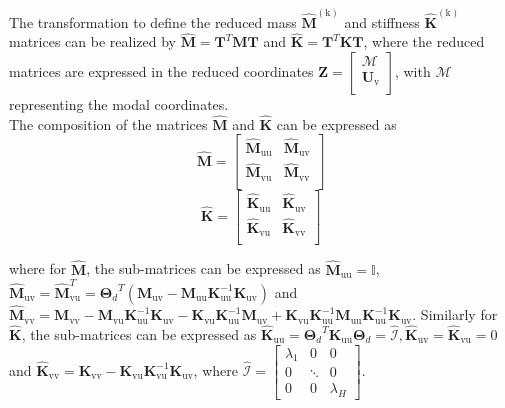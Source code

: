 The transformation to define the reduced mass $\mathbf{\hat{M}}^{(\mathrm k)}$ and stiffness $\mathbf{\hat{K}}^{(\mathrm k)}$ matrices can be realized by
$\mathbf{\hat{M}} = {\mathbf T}^T \mathbf M {\mathbf T}$ and $\mathbf{\hat{K}} = {\mathbf T}^T \mathbf K {\mathbf T}$, where the reduced matrices are expressed in the reduced coordinates $\mathbf{Z} = \left[\begin{array}{cc}
  \mathscr{M} \\
  \bm U_{\mathrm{v}} \\
\end{array}\right]$, with  $\mathscr{M}$ representing the modal coordinates.\\

The composition of the matrices $\mathbf{\hat{M}}$ and $\mathbf{\hat{K}}$ can be expressed as
\begin{equation}
\mathbf{\hat{M}} =\left[
\begin{array}{cc}
  {{\mathbf{\hat M}}}_{\mathrm{uu}} &{\mathbf{\hat M}}_{\mathrm{uv}} \\
  {\mathbf{\hat M}}_{\mathrm{vu}} &{\mathbf{\hat M}}_{\mathrm{vv}} \\
\end{array}
\right] 
\end{equation}
\begin{equation}
\mathbf{\hat{K}} =\left[
\begin{array}{cc}
 {{\mathbf{\hat K}}}_{\mathrm{uu}} &{\mathbf{\hat K}}_{\mathrm{uv}} \\
 {\mathbf{\hat K}}_{\mathrm{vu}} &{\mathbf{\hat K}}_{\mathrm{vv}} \\
\end{array}
\right]
\end{equation}

where for $\mathbf{\hat{M}}$, the sub-matrices can be expressed as 
$ {{\mathbf{\hat M}}}_{\mathrm{uu}} = \mathbb{I}$, ${\mathbf{\hat M}}_{\mathrm{uv}} = {\mathbf{\hat M}}_{\mathrm{vu}}^T=   {{\bm \Theta}_d}^T({\mathbf M}_{\mathrm{uv}} -{\mathbf M}_{\mathrm{uu}}{\mathbf K}_{\mathrm{uu}}^{-1}{\mathbf K}_{\mathrm{uv}})$ and $\mathbf{ \hat{M}}_{\mathrm{vv}}={\mathbf M}_{\mathrm{vv}}-{\mathbf M}_{\mathrm{vu}}{\mathbf K}_{\mathrm{uu}}^{-1}{\mathbf K}_{\mathrm{uv}}-{\mathbf K}_{\mathrm{vu}}{\mathbf K}_{\mathrm{uu}}^{-1}{\mathbf M}_{\mathrm{uv}}+{\mathbf K}_{\mathrm{vu}}{\mathbf K}_{\mathrm{uu}}^{-1}{\mathbf M}_{\mathrm{uu}}{\mathbf K}_{\mathrm{uu}}^{-1}{\mathbf K}_{\mathrm{uv}}$. Similarly for $\mathbf{\hat{K}}$, the sub-matrices can be expressed as
${{\mathbf{\hat K}}}_{\mathrm{uu}} = {{\bm \Theta}_d}^{T} {{\mathbf{K}}}_{\mathrm{uu}} {\bm \Theta}_d = \mathcal{\hat I}, {\mathbf{\hat K}}_{\mathrm{uv}} = {\mathbf{\hat K}}_{\mathrm{vu}}=0$ and $\mathbf{\hat{K}}_{\mathrm{vv}}=\mathbf{{K}}_{\mathrm{vv}}- \mathbf{{K}}_{\mathrm{vu}}\mathbf{{K}}_{\mathrm{vu}}^{-1}\mathbf{{K}}_{\mathrm{uv}}$, where $\mathcal{\hat I} =
\left[
\begin{array}{ccc}
\lambda_1 & 0 & 0 \\
0 & \ddots & 0 \\
0 & 0 & \lambda_H
\end{array}
\right]$.


